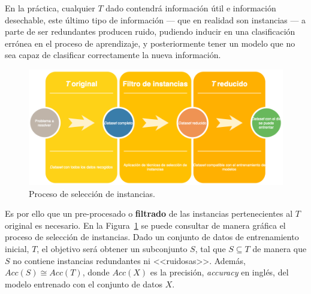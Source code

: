 En la práctica, cualquier $T$ dado contendrá información útil e información desechable, este último tipo de información --- que en realidad son instancias --- a parte de ser redundantes producen ruido, pudiendo inducir en una clasificación errónea en el proceso de aprendizaje, y posteriormente tener un modelo que no sea capaz de clasificar correctamente la nueva información.

\begin{figure}
\centering
\includegraphics[width=\linewidth]{../img/memoria/Instance-Selection-Overview}
\caption{Proceso de selección de instancias.}
\label{fig:instance-election-overview}
\end{figure}

Es por ello que un pre-procesado o \textbf{filtrado} de las instancias pertenecientes al $T$ original es necesario. En la Figura~\ref{fig:instance-election-overview} se puede consultar de manera gráfica el proceso de selección de instancias. Dado un conjunto de datos de entrenamiento inicial, $T$, el objetivo será obtener un subconjunto $S$, tal que $S \subseteq T$ de manera que $S$ no contiene instancias redundantes ni <<ruidosas>>. Además, $Acc(S) \cong Acc(T)$, donde $Acc(X)$ es la precisión, \textit{accuracy} en inglés, del modelo entrenado con el conjunto de datos $X$.

